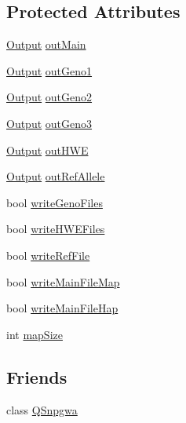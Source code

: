 \subsection*{Protected Attributes}
\begin{DoxyCompactItemize}
\item 
\hyperlink{classOutput}{Output} \hyperlink{classQSnpgwaOutput_ac3038412ce272d15749e62d487d1bf76}{outMain}
\item 
\hyperlink{classOutput}{Output} \hyperlink{classQSnpgwaOutput_a13210554d75274ea4e2fd14480e6144b}{outGeno1}
\item 
\hyperlink{classOutput}{Output} \hyperlink{classQSnpgwaOutput_a94e142191f1b20e3ea9ed7d5619d6537}{outGeno2}
\item 
\hyperlink{classOutput}{Output} \hyperlink{classQSnpgwaOutput_add4f3d1c02269a63a8ca9ab6b6a6692b}{outGeno3}
\item 
\hyperlink{classOutput}{Output} \hyperlink{classQSnpgwaOutput_ae8e2c64a3863e19f6a20835f77c74888}{outHWE}
\item 
\hyperlink{classOutput}{Output} \hyperlink{classQSnpgwaOutput_a9a500d66e2a2f4e0a2f2a361cf4769a4}{outRefAllele}
\item 
bool \hyperlink{classQSnpgwaOutput_a623e09a643beb7b19ffe68037571bb2f}{writeGenoFiles}
\item 
bool \hyperlink{classQSnpgwaOutput_aa3fe3500366b73d73c6ede530c2962c3}{writeHWEFiles}
\item 
bool \hyperlink{classQSnpgwaOutput_a17d5eb6f91e4e3c88c8215c194a47130}{writeRefFile}
\item 
bool \hyperlink{classQSnpgwaOutput_a4962e53bdd5892a0737e5f91c6cb1099}{writeMainFileMap}
\item 
bool \hyperlink{classQSnpgwaOutput_a289ac8eef9d3d51610541bfbec316c7c}{writeMainFileHap}
\item 
int \hyperlink{classQSnpgwaOutput_afd9b23c1ded591a794688c9ebb58103b}{mapSize}
\end{DoxyCompactItemize}
\subsection*{Friends}
\begin{DoxyCompactItemize}
\item 
class \hyperlink{classQSnpgwaOutput_a7db91fc2b62ffb71edee988fd8f7f575}{QSnpgwa}
\end{DoxyCompactItemize}


